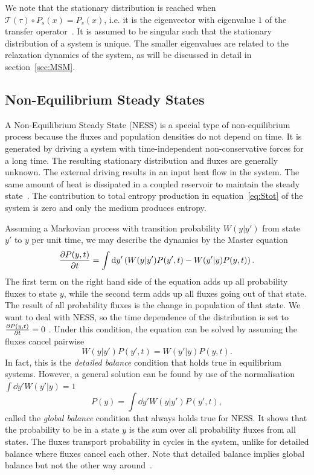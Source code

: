 We note that the stationary distribution is reached when  $\mathscr{T}(\tau) \circ  P_s(x) = P_s(x)$, i.e. it is the eigenvector with eigenvalue $1$ of the transfer operator~\cite{schutte2001transfer}. It is assumed to be singular such that the stationary distribution of a system is unique. The smaller eigenvalues are related to the relaxation dynamics of the system, as will be discussed in detail in section~\ref{sec:MSM}.


\subsection{Non-Equilibrium Steady States}
\label{sec:NESS}
A Non-Equilibrium Steady State (NESS) is a special type of non-equilibrium process because the fluxes and population densities do not depend on time. It is generated by driving a system with time-independent non-conservative forces for a long time. The resulting stationary distribution and fluxes are generally unknown. The external driving  results in an input heat flow in the system. The same amount of heat is dissipated in a coupled reservoir to maintain the steady state~\cite{derrida2007non}. The contribution to total entropy production in equation~\ref{eq:Stot} of the system is zero and only the medium produces entropy.

Assuming a Markovian process with transition probability $ W(y|y')$ from state $y'$ to $y$ per unit time,  we may describe the dynamics by the Master equation~\cite{van1992stochastic}
\begin{equation}
\pdv{P(y,t)}{t} = \int \dd{y'} \left ( W(y|y') P(y',t) - W(y'|y) P(y,t) \right ).\end{equation}
The first term on the right hand side of the equation adds up all probability fluxes to state $y$, while the second term adds up all fluxes going out of that state. The result of all probability fluxes is the change in population of that state. We want to deal with NESS, so the time dependence of the distribution is set to $\pdv{P(y,t)}{t} = 0$ . 
Under this condition, the equation can be solved by assuming the fluxes cancel pairwise
\begin{equation}
 W(y|y') P(y',t) = W(y'|y) P(y,t).
\end{equation}
In fact, this is the \textit{detailed balance} condition that holds true in equilibrium systems. However, a general solution can be found by use of the normalisation $\int \dd{y'} W(y'|y) =1$
\begin{equation}
 P(y) = \int \dd{y'}  W(y|y') P(y',t) ,
 \label{eq:GlobalBalance}
\end{equation}
called the \textit{global balance} condition that always holds true for NESS. It shows that the probability to be in a state $y$ is the sum over all probability fluxes from all states. The fluxes transport probability in cycles in the system, unlike for detailed balance where fluxes cancel each other. Note that detailed balance implies global balance but not the other way around~\cite{van1992stochastic}.

